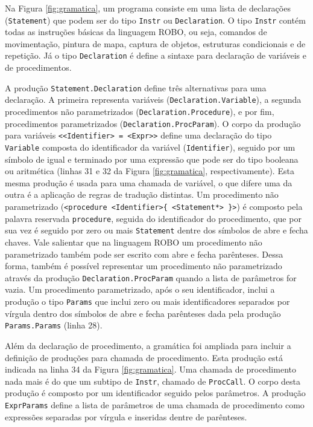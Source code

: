 Na Figura \ref{fig:gramatica}, um programa consiste em uma lista de declarações (\texttt{Statement}) que podem ser do tipo \texttt{Instr} ou \texttt{Declaration}. O tipo \texttt{Instr} contém todas as instruções básicas da linguagem ROBO, ou seja, comandos de movimentação, pintura de mapa, captura de objetos, estruturas condicionais e de repetição. Já o tipo \texttt{Declaration} é define a sintaxe para declaração de variáveis e de procedimentos. 

A produção \texttt{Statement.Declaration} define três alternativas para uma declaração. A primeira representa variáveis (\texttt{Declaration.Variable}), a segunda procedimentos não parametrizados (\texttt{Declaration.Procedure}), e por fim, procedimentos parametrizados (\texttt{Declaration.ProcParam}). O corpo da produção para variáveis \texttt{<<Identifier> = <Expr>>} define uma declaração do tipo \texttt{Variable} composta do identificador da variável (\texttt{Identifier}), seguido por um símbolo de igual e terminado por uma expressão que pode ser do tipo booleana ou aritmética (linhas 31 e 32 da Figura \ref{fig:gramatica}, respectivamente). Esta mesma produção é usada para uma chamada de variável, o que difere uma da outra é a aplicação de regras de tradução distintas. Um procedimento não parametrizado (\texttt{<procedure <Identifier>\{ <Statement*> \}>}) é composto pela palavra reservada \texttt{procedure}, seguida do identificador do procedimento, que por sua vez é seguido por zero ou mais \texttt{Statement} dentre dos símbolos de abre e fecha chaves. Vale salientar que na linguagem ROBO um procedimento não parametrizado também pode ser escrito com abre e fecha parênteses. Dessa forma, também é possível representar um procedimento não parametrizado através da produção \texttt{Declaration.ProcParam} quando a lista de parâmetros for vazia. Um procedimento parametrizado, após o seu identificador, inclui a produção o tipo \texttt{Params} que inclui zero ou mais identificadores separados por vírgula dentro dos símbolos de abre e fecha parênteses dada pela produção \texttt{Params.Params} (linha 28).

Além da declaração de procedimento, a gramática foi ampliada para incluir a definição de produções para chamada de procedimento. Esta produção está indicada na linha 34 da Figura \ref{fig:gramatica}. Uma chamada de procedimento nada mais é do que um subtipo de \texttt{Instr}, chamado de \texttt{ProcCall}. O corpo desta produção é composto por um identificador seguido pelos parâmetros. A produção \texttt{ExprParams} define a lista de parâmetros de uma chamada de procedimento como expressões separadas por vírgula e inseridas dentre de parênteses.

